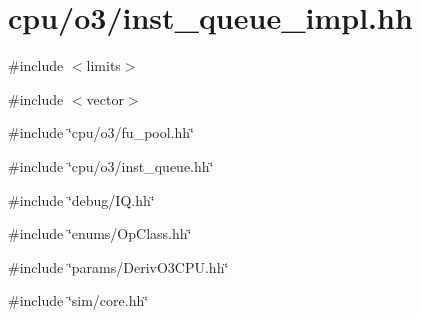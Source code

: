 \hypertarget{o3_2inst__queue__impl_8hh}{
\section{cpu/o3/inst\_\-queue\_\-impl.hh}
\label{o3_2inst__queue__impl_8hh}
}
{\ttfamily \#include $<$limits$>$}\par
{\ttfamily \#include $<$vector$>$}\par
{\ttfamily \#include \char`\"{}cpu/o3/fu\_\-pool.hh\char`\"{}}\par
{\ttfamily \#include \char`\"{}cpu/o3/inst\_\-queue.hh\char`\"{}}\par
{\ttfamily \#include \char`\"{}debug/IQ.hh\char`\"{}}\par
{\ttfamily \#include \char`\"{}enums/OpClass.hh\char`\"{}}\par
{\ttfamily \#include \char`\"{}params/DerivO3CPU.hh\char`\"{}}\par
{\ttfamily \#include \char`\"{}sim/core.hh\char`\"{}}\par
